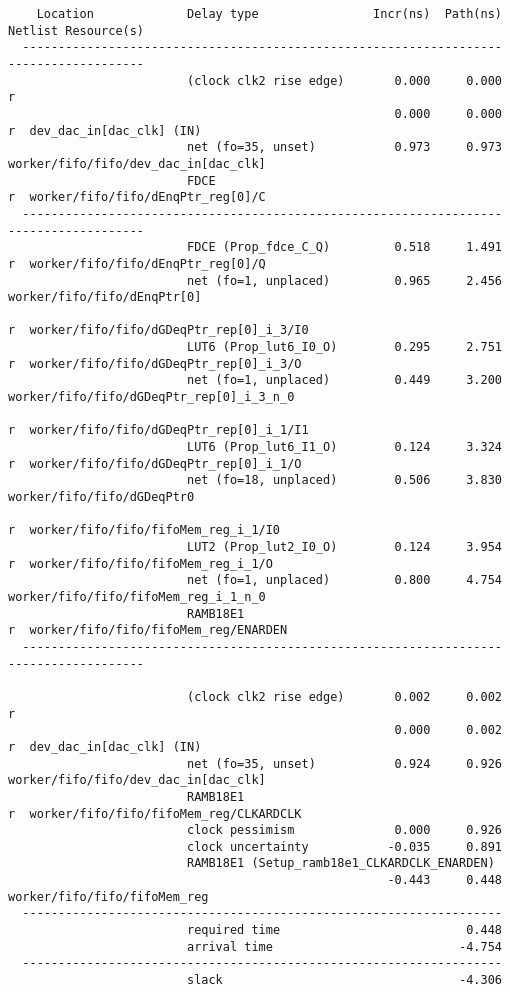 \begin{lstlisting}
    Location             Delay type                Incr(ns)  Path(ns)    Netlist Resource(s)
  -------------------------------------------------------------------    -------------------
                         (clock clk2 rise edge)       0.000     0.000 r
                                                      0.000     0.000 r  dev_dac_in[dac_clk] (IN)
                         net (fo=35, unset)           0.973     0.973    worker/fifo/fifo/dev_dac_in[dac_clk]
                         FDCE                                         r  worker/fifo/fifo/dEnqPtr_reg[0]/C
  -------------------------------------------------------------------    -------------------
                         FDCE (Prop_fdce_C_Q)         0.518     1.491 r  worker/fifo/fifo/dEnqPtr_reg[0]/Q
                         net (fo=1, unplaced)         0.965     2.456    worker/fifo/fifo/dEnqPtr[0]
                                                                      r  worker/fifo/fifo/dGDeqPtr_rep[0]_i_3/I0
                         LUT6 (Prop_lut6_I0_O)        0.295     2.751 r  worker/fifo/fifo/dGDeqPtr_rep[0]_i_3/O
                         net (fo=1, unplaced)         0.449     3.200    worker/fifo/fifo/dGDeqPtr_rep[0]_i_3_n_0
                                                                      r  worker/fifo/fifo/dGDeqPtr_rep[0]_i_1/I1
                         LUT6 (Prop_lut6_I1_O)        0.124     3.324 r  worker/fifo/fifo/dGDeqPtr_rep[0]_i_1/O
                         net (fo=18, unplaced)        0.506     3.830    worker/fifo/fifo/dGDeqPtr0
                                                                      r  worker/fifo/fifo/fifoMem_reg_i_1/I0
                         LUT2 (Prop_lut2_I0_O)        0.124     3.954 r  worker/fifo/fifo/fifoMem_reg_i_1/O
                         net (fo=1, unplaced)         0.800     4.754    worker/fifo/fifo/fifoMem_reg_i_1_n_0
                         RAMB18E1                                     r  worker/fifo/fifo/fifoMem_reg/ENARDEN
  -------------------------------------------------------------------    -------------------

                         (clock clk2 rise edge)       0.002     0.002 r
                                                      0.000     0.002 r  dev_dac_in[dac_clk] (IN)
                         net (fo=35, unset)           0.924     0.926    worker/fifo/fifo/dev_dac_in[dac_clk]
                         RAMB18E1                                     r  worker/fifo/fifo/fifoMem_reg/CLKARDCLK
                         clock pessimism              0.000     0.926
                         clock uncertainty           -0.035     0.891
                         RAMB18E1 (Setup_ramb18e1_CLKARDCLK_ENARDEN)
                                                     -0.443     0.448    worker/fifo/fifo/fifoMem_reg
  -------------------------------------------------------------------
                         required time                          0.448
                         arrival time                          -4.754
  -------------------------------------------------------------------
                         slack                                 -4.306




\end{lstlisting}


